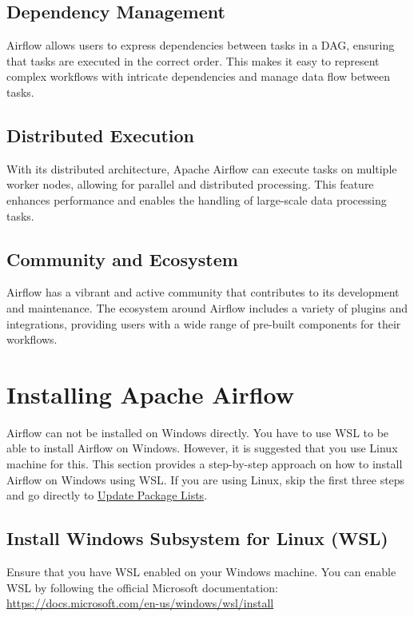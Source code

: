 \subsection{Dependency Management}

Airflow allows users to express dependencies between tasks in a DAG, ensuring that tasks are executed in the correct order. This makes it easy to represent complex workflows with intricate dependencies and manage data flow between tasks.

\subsection{Distributed Execution}

With its distributed architecture, Apache Airflow can execute tasks on multiple worker nodes, allowing for parallel and distributed processing. This feature enhances performance and enables the handling of large-scale data processing tasks.

\subsection{Community and Ecosystem}

Airflow has a vibrant and active community that contributes to its development and maintenance. The ecosystem around Airflow includes a variety of plugins and integrations, providing users with a wide range of pre-built components for their workflows.

\section{Installing Apache Airflow}

Airflow can not be installed on Windows directly. You have to use WSL to be able to install Airflow on Windows. However, it is suggested that you use Linux machine for this. This section provides a step-by-step approach on how to install Airflow on Windows using WSL. If you are using Linux, skip the first three steps and go directly to \hyperref[subsec:wsl_update_packge]{Update Package Lists}.

\subsection{Install Windows Subsystem for Linux (WSL)}

Ensure that you have WSL enabled on your Windows machine. You can enable WSL by following the official Microsoft documentation: \url{https://docs.microsoft.com/en-us/windows/wsl/install}

